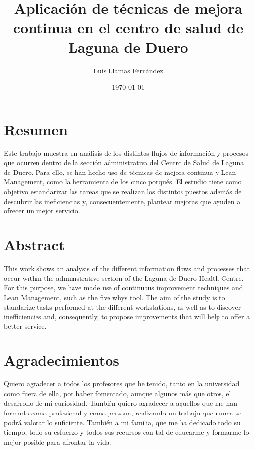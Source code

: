 \documentclass[12pt, a4paper, twoside, openright]{report}
\begin{document}
\title{Aplicación de técnicas de mejora continua en el centro de salud de Laguna de Duero}
\author{Luis Llamas Fernández}
\date{\today}
\maketitle

\thispagestyle{empty}

\chapter*{Resumen}
Este trabajo muestra un análisis de los distintos flujos de información y procesos que ocurren dentro de la sección 
administrativa del Centro de Salud de Laguna de Duero.
Para ello, se han hecho uso de técnicas de mejora continua y Lean 
Management, como la herramienta de los cinco porqués.
El estudio tiene como objetivo estandarizar las tareas que se realizan 
los distintos puestos además de descubrir las ineficiencias y, consecuentemente, plantear mejoras que ayuden a ofrecer un 
mejor servicio.


\setcounter{page}{1}

\chapter*{Abstract}
This work shows an analysis of the different information flows and processes that occur within the administrative section of the Laguna de Duero Health Centre.
For this purpose, we have made use of continuous improvement techniques and Lean  Management, such as the five whys tool.
The aim of the study is to standarize tasks performed at the different workstations, as well as to discover inefficiencies and, consequently, to propose improvements that will help to offer a better service.


\chapter*{Agradecimientos}
Quiero agradecer a todos los profesores que he tenido, tanto en la universidad como fuera de ella, por haber fomentado, aunque algunos más que otros, el desarrollo de mi curiosidad. También quiero agradecer a aquellos que me han formado como profesional y como persona, realizando un trabajo que nunca se podrá valorar lo suficiente. También a mi familia, que me ha dedicado todo su tiempo, todo su esfuerzo y todos sus recursos con tal de educarme y formarme lo mejor posible para afrontar la vida.
\end{document}
